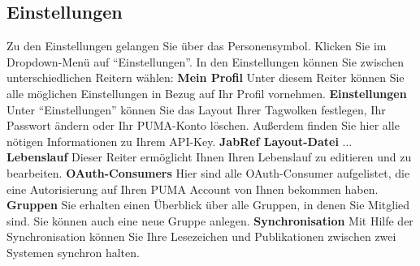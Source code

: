 \documentclass[b5paper,11pt,twoside]{scrbook} %
\begin{document}
\subsection{Einstellungen}
Zu den Einstellungen gelangen Sie über das Personensymbol. Klicken Sie im Dropdown-Menü auf \enquote{Einstellungen}. In den Einstellungen können Sie zwischen unterschiedlichen Reitern wählen:\newline \newline
\textbf{Mein Profil} \newline
Unter diesem Reiter können Sie alle möglichen Einstellungen in Bezug auf Ihr Profil vornehmen.\newline \newline
\textbf{Einstellungen} \newline
Unter \enquote{Einstellungen} können Sie das Layout Ihrer Tagwolken festlegen, Ihr Passwort ändern oder Ihr PUMA-Konto löschen. Außerdem finden Sie hier alle nötigen Informationen zu Ihrem API-Key.\newline \newline
\textbf{JabRef Layout-Datei}\newline
... \newline \newline
\textbf{Lebenslauf} \newline
Dieser Reiter ermöglicht Ihnen Ihren Lebenslauf zu editieren und zu bearbeiten. \newline \newline
\textbf{OAuth-Consumers} \newline
Hier sind alle OAuth-Consumer aufgelistet, die eine Autorisierung auf Ihren PUMA Account von Ihnen bekommen haben. \newline \newline
\textbf{Gruppen}\newline
Sie erhalten einen Überblick über alle Gruppen, in denen Sie Mitglied sind. Sie können auch eine neue Gruppe anlegen. \newline \newline
\textbf{Synchronisation} \newline
Mit Hilfe der Synchronisation können Sie Ihre Lesezeichen und Publikationen zwischen zwei Systemen synchron halten. 
\end{document}
